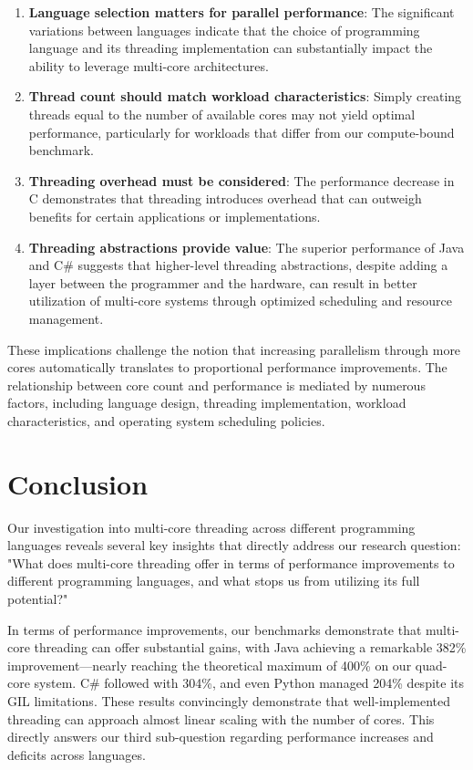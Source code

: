\documentclass[12pt,a4paper]{article}
\begin{document}
\begin{enumerate}
    \item \textbf{Language selection matters for parallel performance}: The significant variations between languages indicate that the choice of programming language and its threading implementation can substantially impact the ability to leverage multi-core architectures.
    
    \item \textbf{Thread count should match workload characteristics}: Simply creating threads equal to the number of available cores may not yield optimal performance, particularly for workloads that differ from our compute-bound benchmark.
    
    \item \textbf{Threading overhead must be considered}: The performance decrease in C demonstrates that threading introduces overhead that can outweigh benefits for certain applications or implementations.
    
    \item \textbf{Threading abstractions provide value}: The superior performance of Java and C\# suggests that higher-level threading abstractions, despite adding a layer between the programmer and the hardware, can result in better utilization of multi-core systems through optimized scheduling and resource management.
\end{enumerate}

These implications challenge the notion that increasing parallelism through more cores automatically translates to proportional performance improvements. The relationship between core count and performance is mediated by numerous factors, including language design, threading implementation, workload characteristics, and operating system scheduling policies.

\section{Conclusion}

Our investigation into multi-core threading across different programming languages reveals several key insights that directly address our research question: "What does multi-core threading offer in terms of performance improvements to different programming languages, and what stops us from utilizing its full potential?"

In terms of performance improvements, our benchmarks demonstrate that multi-core threading can offer substantial gains, with Java achieving a remarkable 382\% improvement—nearly reaching the theoretical maximum of 400\% on our quad-core system. C\# followed with 304\%, and even Python managed 204\% despite its GIL limitations. These results convincingly demonstrate that well-implemented threading can approach almost linear scaling with the number of cores. This directly answers our third sub-question regarding performance increases and deficits across languages.
\end{document}
